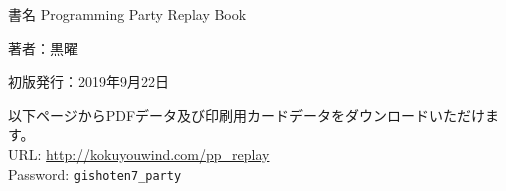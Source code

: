 \documentclass[index]{subfiles}
\begin{document}
  \thispagestyle{empty}
  \begin{flushright}
    \begin{minipage}{0.7\hsize}
      \begin{description}
        \item{書名} Programming Party Replay Book
        \item{著者：}黒曜
        \item{初版発行：}2019年9月22日
      \end{description}
    \end{minipage}
  \end{flushright}
  \begin{flushright}
  \begin{minipage}{0.9\hsize}
  以下ページからPDFデータ及び印刷用カードデータをダウンロードいただけます。 \\
  URL: \url{http://kokuyouwind.com/pp_replay} \\
  Password: \verb|gishoten7_party|
  \end{minipage}
  \end{flushright}
\end{document}
